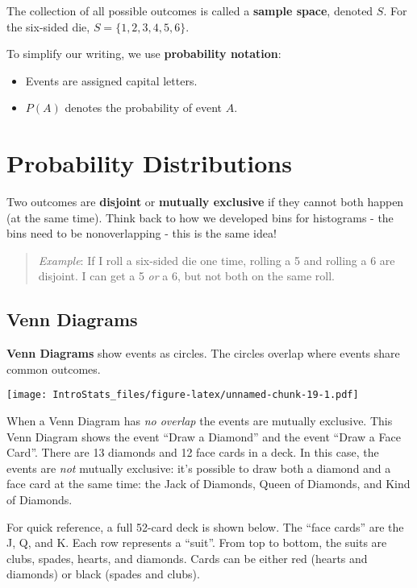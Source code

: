 \documentclass[
]{book}
\providecommand{\tightlist}{%
  \setlength{\itemsep}{0pt}\setlength{\parskip}{0pt}}
\begin{document}
The collection of all possible outcomes is called a \textbf{sample space}, denoted \(S\). For the six-sided die, \(S=\{1,2,3,4,5,6\}\).

To simplify our writing, we use \textbf{probability notation}:

\begin{itemize}
\tightlist
\item
  Events are assigned capital letters.
\item
  \(P(A)\) denotes the probability of event \(A\).
\end{itemize}

\hypertarget{probability-distributions}{%
\section{Probability Distributions}\label{probability-distributions}}

Two outcomes are \textbf{disjoint} or \textbf{mutually exclusive} if they cannot both happen (at the same time). Think back to how we developed bins for histograms - the bins need to be nonoverlapping - this is the same idea!

\begin{quote}
\emph{Example}: If I roll a six-sided die one time, rolling a 5 and rolling a 6 are disjoint. I can get a 5 \emph{or} a 6, but not both on the same roll.
\end{quote}

\hypertarget{venn-diagrams}{%
\subsection{Venn Diagrams}\label{venn-diagrams}}

\textbf{Venn Diagrams} show events as circles. The circles overlap where events share common outcomes.

\texttt{[image: IntroStats\_files/figure-latex/unnamed-chunk-19-1.pdf]}

When a Venn Diagram has \emph{no overlap} the events are mutually exclusive. This Venn Diagram shows the event ``Draw a Diamond'' and the event ``Draw a Face Card''. There are 13 diamonds and 12 face cards in a deck. In this case, the events are \emph{not} mutually exclusive: it's possible to draw both a diamond and a face card at the same time: the Jack of Diamonds, Queen of Diamonds, and Kind of Diamonds.

For quick reference, a full 52-card deck is shown below. The ``face cards'' are the J, Q, and K. Each row represents a ``suit''. From top to bottom, the suits are clubs, spades, hearts, and diamonds. Cards can be either red (hearts and diamonds) or black (spades and clubs).
\end{document}
